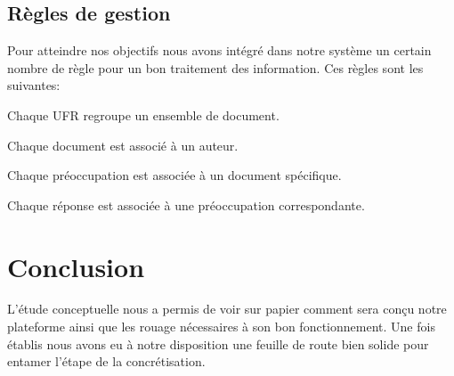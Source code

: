 \subsection{Règles de gestion}
Pour atteindre nos objectifs nous avons intégré dans notre système un certain nombre de règle pour un bon traitement des information. Ces règles sont les suivantes:
\renewcommand{\labelitemi}{\tiny$\bullet$}
\begin{itemize}[leftmargin=2cm, topsep=0pt]
        \begin{spacing}{1.25}
        
        \item Chaque UFR regroupe un ensemble de document.
        \item Chaque document est associé à un auteur.
        \item Chaque préoccupation est associée à un document spécifique.
        \item Chaque réponse est associée à une préoccupation correspondante.
        \end{spacing}
\end{itemize}
\begin{spacing}{0.5}
\end{spacing}

\section*{Conclusion}
L'étude conceptuelle nous a permis de voir sur papier comment sera conçu notre plateforme ainsi que les rouage nécessaires à son bon fonctionnement. Une fois établis nous avons eu à notre disposition une feuille de route bien solide pour entamer l'étape de la concrétisation.